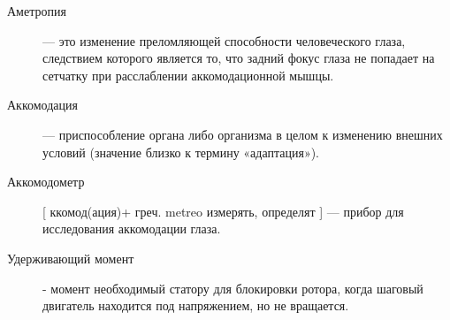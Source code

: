 \begin{description}
\item[Аметропия] --- это изменение преломляющей способности человеческого глаза, следствием которого является то, что задний фокус глаза не попадает на сетчатку при расслаблении аккомодационной мышцы.\cite{b_1}

\item[Аккомодация] --- приспособление органа либо организма в целом к изменению внешних условий (значение близко к термину «адаптация»).\cite{b_2}

\item[Аккомодометр][ ккомод(ация)+ греч. metreo измерять, определят ] --- прибор для исследования аккомодации глаза.\cite{b_3}
\item[Удерживающий момент] - момент необходимый статору для блокировки ротора, когда шаговый двигатель находится под напряжением, но не вращается.\cite{s_3}
\end{description}